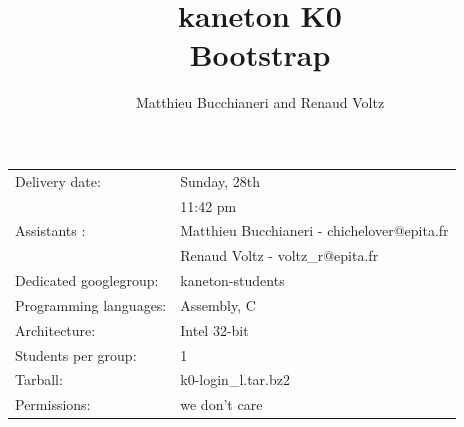 %
%
%
%
%
%

%
%

\def\path{../../..}

%
%



\usepackage{pdfpages}

%
%


%
%

\title{kaneton K0\\Bootstrap}

%
%

\author{\small{Matthieu Bucchianeri} and
        \small{Renaud Voltz}}

%
%



\maketitle

\vspace{5mm}

\begin{tabular}{p{7cm}l}
Delivery date: & Sunday, 28th \\
               & 11:42 pm \\
Assistants : & Matthieu Bucchianeri - \small{chichelover@epita.fr} \\
             & Renaud Voltz - \small{voltz\_r@epita.fr} \\
Dedicated googlegroup: & kaneton-students \\
Programming languages: & Assembly, C \\
Architecture: & Intel 32-bit \\
Students per group: & 1\\
Tarball: & k0-login\_l.tar.bz2\\
Permissions: & we don't care
\end{tabular}


